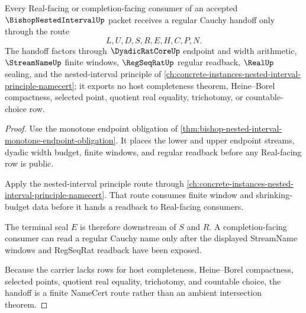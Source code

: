 \begin{theorem}
\label{thm:bishop-nested-interval-regular-cauchy-handoff}
Every Real-facing or completion-facing consumer of an accepted $\BishopNestedIntervalUp$ packet receives a regular Cauchy handoff only through the route
$$
L,U,D,S,R,E,H,C,P,N .
$$
The handoff factors through $\DyadicRatCoreUp$ endpoint and width arithmetic, $\StreamNameUp$ finite windows, $\RegSeqRatUp$ regular readback, $\RealUp$ sealing, and the nested-interval principle of \autoref{ch:concrete-instances-nested-interval-principle-namecert}; it exports no host completeness theorem, Heine--Borel compactness, selected point, quotient real equality, trichotomy, or countable-choice row.
\end{theorem}
\begin{proof}
Use the monotone endpoint obligation of \autoref{thm:bishop-nested-interval-monotone-endpoint-obligation}. It places the lower and upper endpoint streams, dyadic width budget, finite windows, and regular readback before any Real-facing row is public.

Apply the nested-interval principle route through \autoref{ch:concrete-instances-nested-interval-principle-namecert}. That route consumes finite window and shrinking-budget data before it hands a readback to Real-facing consumers.

The terminal seal $E$ is therefore downstream of $S$ and $R$. A completion-facing consumer can read a regular Cauchy name only after the displayed StreamName windows and RegSeqRat readback have been exposed.

Because the carrier lacks rows for host completeness, Heine--Borel compactness, selected points, quotient real equality, trichotomy, and countable choice, the handoff is a finite NameCert route rather than an ambient intersection theorem.
\end{proof}

